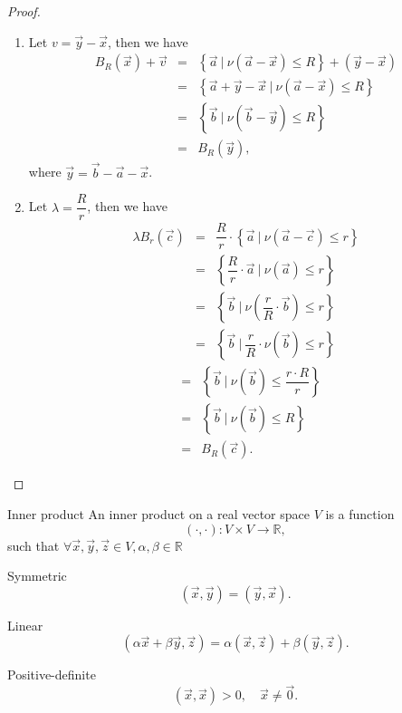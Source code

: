\begin{proof}
    \begin{enumerate}
        \item Let $v=\vec{y}-\vec{x}$, then we have
        \begin{eqnarray}
               B_R(\vec{x}) + \vec{v} 
               &=& \left\{\vec{a}\ | \ \nu\left(\vec{a} - \vec{x}\right) \leq R\right\} + \left(\vec{y} - \vec{x}\right)  \nonumber\\ 
               &=& \left\{\vec{a} + \vec{y} - \vec{x}\ | \ \nu\left(\vec{a} - \vec{x}\right) \leq R\right\} \nonumber\\
               &=& \left\{\vec{b}\ | \ \nu\left(\vec{b} - \vec{y}\right) \leq R \right\} \nonumber\\
               &=& B_R(\vec{y}), \nonumber
        \end{eqnarray}
        where $\vec{y}= \vec{b} - \vec{a} - \vec{x}$.
        \item Let $\lambda=\dfrac{R}{r}$, then we have
        \begin{eqnarray}    
                 \lambda  B_r(\vec{c}) &=& \dfrac{R}{r}\cdot \left\{\vec{a}\ | \ \nu\left(\vec{a}-\vec{c}\right) \leq r\right\} \nonumber\\
                  &=& \left\{\dfrac{R}{r} \cdot \vec{a} \ | \ \nu\left(\vec{a}\right) \leq r\right\} \nonumber\\
                 &=& \left\{\vec{b}\ | \ \nu\left(\dfrac{r}{R} \cdot \vec{b}\right) \leq r\right\} \nonumber\\
                 &=& \left\{\vec{b}\ | \ \dfrac{r}{R} \cdot \nu \left(\vec{b}\right) \leq r\right\} \nonumber
        \end{eqnarray}
        \begin{eqnarray}           
                 &=& \left\{\vec{b}\ | \ \nu\left(\vec{b}\right) \leq \dfrac{r\cdot R}{r}\right\} \nonumber\\
                  &=&\left\{\vec{b} \ | \ \nu\left(\vec{b}\right) \leq R\right\}\nonumber \\
                &=& B_R(\vec{c}).\nonumber 
        \end{eqnarray}
    \end{enumerate}
\end{proof}
\begin{definition}{Inner product}{}
    An inner product on a real vector space $V$ is a function
    $$
    (\cdot,\cdot): V\times V\rightarrow \mathbb{R},
    $$
    such that $\forall \vec{x},\vec{y},\vec{z}\in V, \alpha,\beta\in\mathbb{R}$    
    \begin{enumerate*}
        \item Symmetric
        \[ 
            (\vec{x},\vec{y})=(\vec{y},\vec{x}).
        \]
        \item Linear \[
            (\alpha\vec{x}+\beta\vec{y},\vec{z})=
            \alpha(\vec{x},\vec{z})+\beta(\vec{y},\vec{z}).
        \]
        \item Positive-definite
        \[ 
            (\vec{x},\vec{x})>0, \quad \vec{x}\neq \vec{0}.
        \]
    \end{enumerate*}
\end{definition}

